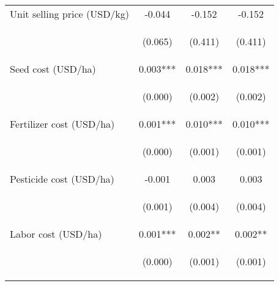 \begin{center}
\begin{tabular}{lccc}
Unit selling price (USD/kg) & -0.044 & -0.152 & -0.152 \\
\vspace{4pt} & \begin{footnotesize}(0.065)\end{footnotesize} & \begin{footnotesize}(0.411)\end{footnotesize} & \begin{footnotesize}(0.411)\end{footnotesize} \\
Seed cost (USD/ha) & 0.003*** & 0.018*** & 0.018*** \\
\vspace{4pt} & \begin{footnotesize}(0.000)\end{footnotesize} & \begin{footnotesize}(0.002)\end{footnotesize} & \begin{footnotesize}(0.002)\end{footnotesize} \\
Fertilizer cost (USD/ha) & 0.001*** & 0.010*** & 0.010*** \\
\vspace{4pt} & \begin{footnotesize}(0.000)\end{footnotesize} & \begin{footnotesize}(0.001)\end{footnotesize} & \begin{footnotesize}(0.001)\end{footnotesize} \\
Pesticide cost (USD/ha) & -0.001 & 0.003 & 0.003 \\
\vspace{4pt} & \begin{footnotesize}(0.001)\end{footnotesize} & \begin{footnotesize}(0.004)\end{footnotesize} & \begin{footnotesize}(0.004)\end{footnotesize} \\
Labor cost (USD/ha) & 0.001*** & 0.002** & 0.002** \\
\vspace{4pt} & \begin{footnotesize}(0.000)\end{footnotesize} & \begin{footnotesize}(0.001)\end{footnotesize} & \begin{footnotesize}(0.001)\end{footnotesize} \\

\end{tabular}
\end{center}
